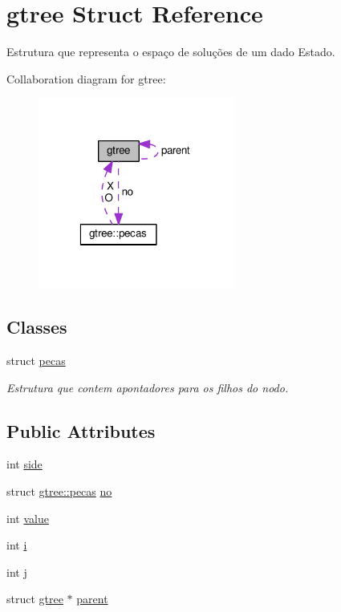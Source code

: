 \hypertarget{structgtree}{\section{gtree Struct Reference}
\label{structgtree}
}


Estrutura que representa o espaço de soluções de um dado Estado.  




Collaboration diagram for gtree\+:\nopagebreak
\begin{figure}[H]
\begin{center}
\leavevmode
\includegraphics[width=183pt]{structgtree__coll__graph}
\end{center}
\end{figure}
\subsection*{Classes}
\begin{DoxyCompactItemize}
\item 
struct \hyperlink{structgtree_1_1pecas}{pecas}
\begin{DoxyCompactList}\small\item\em Estrutura que contem apontadores para os filhos do nodo. \end{DoxyCompactList}\end{DoxyCompactItemize}
\subsection*{Public Attributes}
\begin{DoxyCompactItemize}
\item 
int \hyperlink{structgtree_aa846f96e7fe88d420efe940ba26600b1}{side}
\item 
struct \hyperlink{structgtree_1_1pecas}{gtree\+::pecas} \hyperlink{structgtree_a9f38e15f251baa31c64e318434d17b0a}{no}
\item 
int \hyperlink{structgtree_a0eb754f1a6a1ffb0318bf6a37cdabba1}{value}
\item 
int \hyperlink{structgtree_adc3b4827f553f4791f357b0dfa35909c}{i}
\item 
int \hyperlink{structgtree_a27e5ef16fc462e2cc8a22f32ed74c4d7}{j}
\item 
struct \hyperlink{structgtree}{gtree} $\ast$ \hyperlink{structgtree_ac1cb61353a3071797136ae875d897c8d}{parent}
\end{DoxyCompactItemize}


